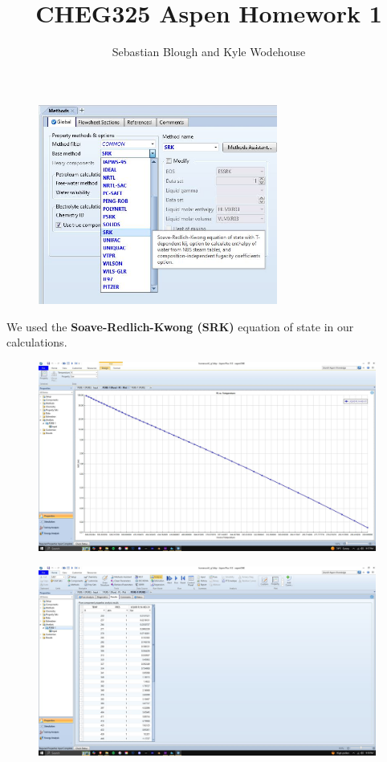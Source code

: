 \documentclass{article}
\title{\bfseries CHEG325 Aspen Homework 1}
\author{Sebastian Blough and Kyle Wodehouse}
\date{}
\begin{document}
\maketitle

\begin{figure}[H]
    \centering
    \includegraphics[width=0.7\textwidth, frame]{img/1.JPG}
\end{figure}
\noindent
We used the \textbf{Soave-Redlich-Kwong (SRK)} equation of state in our calculations.

\begin{figure}[H]
    \centering
    \includegraphics[width=0.99\textwidth, frame]{img/2.JPG}
\end{figure}

\begin{figure}[H]
    \centering
    \includegraphics[width=0.99\textwidth, frame]{img/3.JPG}
\end{figure}
\end{document}
